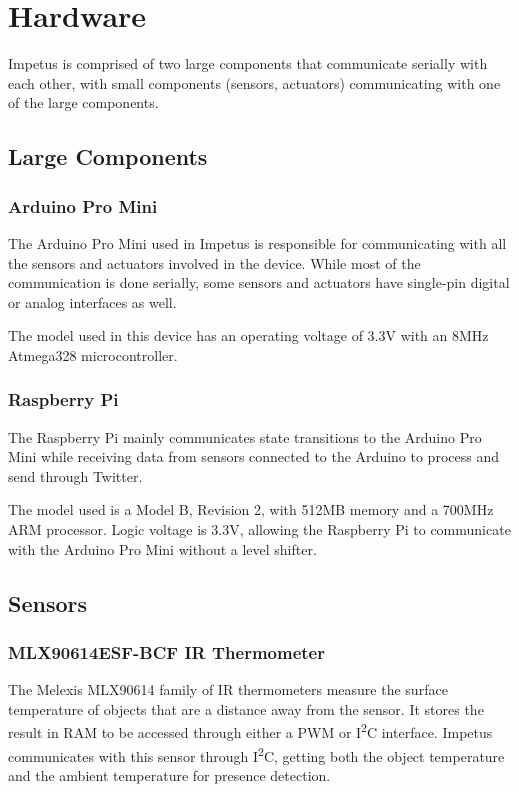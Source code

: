 \chapter{Hardware}
Impetus is comprised of two large components that communicate serially
with each other, with small components (sensors, actuators)
communicating with one of the large components.

\section{Large Components}
\subsection{Arduino Pro Mini}
The Arduino Pro Mini used in Impetus is responsible for communicating
with all the sensors and actuators involved in the device. While most
of the communication is done serially, some sensors and actuators have
single-pin digital or analog interfaces as well.

The model used in this device has an operating voltage of 3.3V with an
8MHz Atmega328 microcontroller.

\subsection{Raspberry Pi}
The Raspberry Pi mainly communicates state transitions to the Arduino
Pro Mini while receiving data from sensors connected to the Arduino to
process and send through Twitter.

The model used is a Model B, Revision 2, with 512MB memory and a 700MHz
ARM processor. Logic voltage is 3.3V, allowing the Raspberry Pi to
communicate with the Arduino Pro Mini without a level shifter.

\section{Sensors}
\subsection{MLX90614ESF-BCF IR Thermometer}
The Melexis MLX90614 family of IR thermometers measure the surface
temperature of objects that are a distance away from the sensor. It
stores the result in RAM to be accessed through either a PWM or
I\textsuperscript{2}C interface. Impetus communicates with this sensor
through I\textsuperscript{2}C, getting both the object temperature and
the ambient temperature for presence detection.

